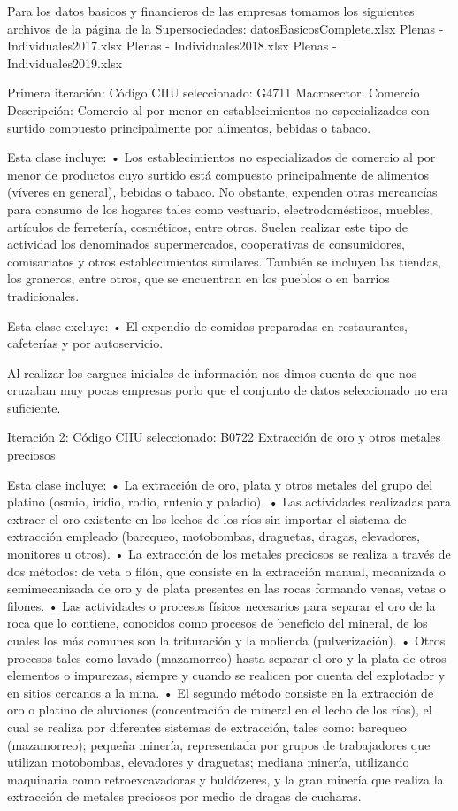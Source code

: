 \documentclass[
  11pt,
]{article}
\begin{document}
Para los datos basicos y financieros de las empresas tomamos los
siguientes archivos de la página de la Supersociedades:
datosBasicosComplete.xlsx Plenas - Individuales2017.xlsx Plenas -
Individuales2018.xlsx Plenas - Individuales2019.xlsx

Primera iteración: Código CIIU seleccionado: G4711 Macrosector: Comercio
Descripción: Comercio al por menor en establecimientos no especializados
con surtido compuesto principalmente por alimentos, bebidas o tabaco.

Esta clase incluye: • Los establecimientos no especializados de comercio
al por menor de productos cuyo surtido está compuesto principalmente de
alimentos (víveres en general), bebidas o tabaco. No obstante, expenden
otras mercancías para consumo de los hogares tales como vestuario,
electrodomésticos, muebles, artículos de ferretería, cosméticos, entre
otros. Suelen realizar este tipo de actividad los denominados
supermercados, cooperativas de consumidores, comisariatos y otros
establecimientos similares. También se incluyen las tiendas, los
graneros, entre otros, que se encuentran en los pueblos o en barrios
tradicionales.

Esta clase excluye: • El expendio de comidas preparadas en restaurantes,
cafeterías y por autoservicio.

Al realizar los cargues iniciales de información nos dimos cuenta de que
nos cruzaban muy pocas empresas porlo que el conjunto de datos
seleccionado no era suficiente.

Iteración 2: Código CIIU seleccionado: B0722 Extracción de oro y otros
metales preciosos

Esta clase incluye: • La extracción de oro, plata y otros metales del
grupo del platino (osmio, iridio, rodio, rutenio y paladio). • Las
actividades realizadas para extraer el oro existente en los lechos de
los ríos sin importar el sistema de extracción empleado (barequeo,
motobombas, draguetas, dragas, elevadores, monitores u otros). • La
extracción de los metales preciosos se realiza a través de dos métodos:
de veta o filón, que consiste en la extracción manual, mecanizada o
semimecanizada de oro y de plata presentes en las rocas formando venas,
vetas o filones. • Las actividades o procesos físicos necesarios para
separar el oro de la roca que lo contiene, conocidos como procesos de
beneficio del mineral, de los cuales los más comunes son la trituración
y la molienda (pulverización). • Otros procesos tales como lavado
(mazamorreo) hasta separar el oro y la plata de otros elementos o
impurezas, siempre y cuando se realicen por cuenta del explotador y en
sitios cercanos a la mina. • El segundo método consiste en la extracción
de oro o platino de aluviones (concentración de mineral en el lecho de
los ríos), el cual se realiza por diferentes sistemas de extracción,
tales como: barequeo (mazamorreo); pequeña minería, representada por
grupos de trabajadores que utilizan motobombas, elevadores y draguetas;
mediana minería, utilizando maquinaria como retroexcavadoras y
buldózeres, y la gran minería que realiza la extracción de metales
preciosos por medio de dragas de cucharas.
\end{document}
